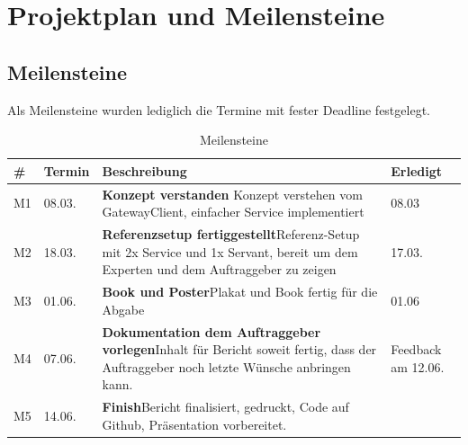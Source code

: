\section{Projektplan und Meilensteine}
\subsection{Meilensteine}
Als Meilensteine wurden lediglich die Termine mit fester Deadline festgelegt.
\begin{table}[H]
	\centering
	\begin{tabular}{llp{11cm}p{2cm}} \toprule
		\textbf{\#} 			& \textbf{Termin}	& \textbf{Beschreibung}	& \textbf{Erledigt}	\\ \midrule
		M1 & 08.03. & \textbf{Konzept verstanden} \newline Konzept verstehen vom GatewayClient, einfacher Service implementiert	& 08.03\\ \midrule
		M2 & 18.03. & \textbf{Referenzsetup fertiggestellt}\newline  Referenz-Setup mit 2x Service und 1x Servant, bereit um dem Experten und dem Auftraggeber zu zeigen & 17.03.	\\ \midrule
		M3 & 01.06. & \textbf{Book und Poster}\newline  Plakat und Book fertig für die Abgabe & 01.06	\\ \midrule				
		M4 & 07.06. & \textbf{Dokumentation dem Auftraggeber vorlegen}\newline  Inhalt für Bericht soweit fertig, dass der Auftraggeber noch letzte Wünsche anbringen kann.& Feedback am 12.06.	\\ \midrule
		M5 & 14.06. & \textbf{Finish}\newline Bericht finalisiert, gedruckt, Code auf Github, Präsentation vorbereitet.	\\ \bottomrule
	\end{tabular}
	\caption{Meilensteine}
	\label{tab:meilensteine}
\end{table}

